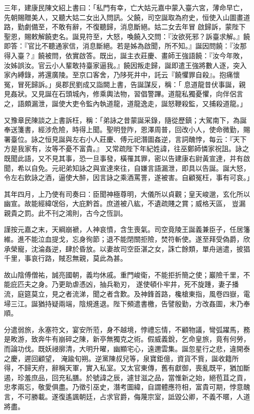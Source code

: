 \begin{pinyinscope}
 三年，建康民陳文紹上書曰：「私門有幸，亡大姑元嘉中蒙入臺六宮，薄命早亡，先朝賜贈美人，又聽大姑二女出入問訊。父饒，司空誕取為府史，恒使入山圖畫道路，勤劇備至，不敢有辭，不復聽歸，消息斷絕。姑二女去年冒
 啟歸訴，蒙陛下聖恩，賜敕解饒吏名。誕見符至，大怒，喚饒入交問：『汝欲死邪？訴臺求解。』饒即答：『官比不聽通家信，消息斷絕。若是姊為啟聞，所不知。』誕因問饒：『汝那得入臺？』饒被問，依實啟答。既出，誕主衣莊慶、畫師王強語饒：『汝今年敗，汝姊誤汝。官云小人輩敢持臺家逼我。』饒因叛走歸，誕即遣王強將數人逐，突入家內縛錄，將還廣陵。至京口客舍，乃陊死井中，託云『饒懼罪自殺』。抱痛懷冤，冒死歸訴。」吳郡民劉成又詣闕上書，告誕謀反，稱：「
 息道龍昔伏事誕，親見姦狀。又見誕在石頭城內，修乘輿法物，習倡警蹕。道龍私獨憂懼，向伴侶言之，語頗漏泄，誕使大吏令監內執道龍，道龍逸走，誕怒鞭殺監，又捕殺道龍。」



 又豫章民陳談之上書訴枉，稱：「弟詠之昔蒙誕采錄，隨從歷鎮；大駕南下，為誕奉送箋書，經涉危險，時得上聞。聖明登阼，恩澤周普，回改小人，使命微勤，賜署臺位。詠之恒見誕與左右小人莊慶、傅元祀潛圖姦逆，言詞醜悖，每云：『天下方是我家有，汝等不憂不富貴。』
 又常疏陛下年紀姓諱，往巫鄭師憐家祝詛。詠之既聞此語，又不見其事，恐一旦事發，橫罹其罪，密以告建康右尉黃宣達，并有啟聞，希以自免。元祀弟知詠之與宣達來往，自嫌言語漏泄，即具以告誕。誕大怒，令左右飲詠之酒，逼使大醉，因言詠之乘酒罵詈，遂被害。自顧冤枉，事有可哀。」



 其年四月，上乃使有司奏曰：臣聞神極尊明，大儀所以貞觀；皇天峻邈，玄化所以幽宣。故能經緯氓俗，大庇黔首。庶道被八紘，不遺疏賤之賞；威格天區，
 豈漏親貴之罰。此不刊之鴻則，古今之恆訓。



 謹按元嘉之末，天綱崩褫，人神哀憤，含生喪氣。司空竟陵王誕義兼臣子，任居籓維。進不能泣血提戈，忘身徇節；退不能閉關拒險，焚符斬使。遂至拜受偽爵，欣承榮寵，沈淪姦逆，肆於昏放。以妻故司空臣湛之女，誅亡餘類，單舟遄遣，披猖千里，事哀行路，賊忍無親，莫此為甚。



 故山陰傅僧祐，誠亮國朝，義均休戚。重門峻衛，不能拒折簡之使；巖險千里，不能庇匹夫之身。乃更助虐憑凶，抽兵勒刃，
 遂使頓仆牢井，死不旋踵，妻子播流，庭筵莫立，見之者流涕，聞之者含歎。及神鋒首路，欃槍東指，風卷四嶽，電埽三江。誕猶持疑兩端，陰規進退。陛下頻遣書檄，告譬殷勤，方改姦圖，末乃奉順。



 分遣弱旅，永塞符文，宴安所蒞，身不越境，悖禮忘情，不顧物議，彎弧躍馬，務是畋游，致奔牛有崩碎之陳，新亭無獨克之術。假威義銳，乞命皇旅，竟有何勞，而論功伐。既妖祲廓清，大明升曜，幽顯宅心，遠邇雲集。誕忽星行之悲，違開泰之慶，遲回顧望，
 淹踰旬朔。逆黨陳叔兒等，泉寶鉅億，資貨不貲，誕收籍所得，不歸天府，辭稱天軍，實入私室。又太官東傳，舊有獻御，喪亂既平，猶加斷遏，珍羞庶品，回充私膳。於號諱之辰，遽甘滋之品，當惟新之始，絕苞苴之貢，忠孝兩忘，敬愛俱盡。乃徵引巫史，潛考圖緯，自謂體應符相，富貴可期，悖意醜言，不可勝載。遂復遙諷朝廷，占求官爵，侮蔑宗室，詆毀公卿，不義不暱，人道將盡。




\end{pinyinscope}
